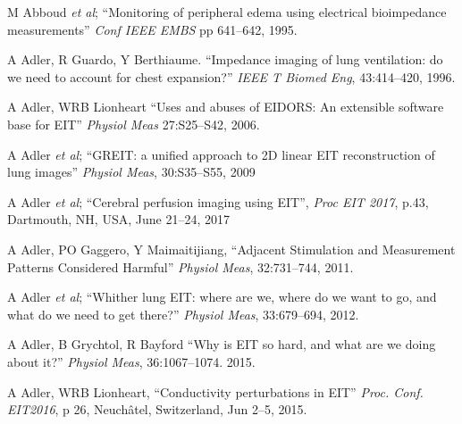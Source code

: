 \documentclass[10pt,journal]{IEEEtran}\def\TBLWIDA{15mm}\def\TBLWIDB{60mm}
\newcommand{\ifmaxthree}[2]{#2 {\em et al}; }
\begin{document}
\begin{thebibliography}{00}
      \setlength{\parskip}{0ex}%
      \setlength{\itemsep}{0ex}%
\ifmaxthree{
M Abboud, R Guardo, R Martineau, J Taillefer, C  Pelletier, 
}{
M Abboud
}
``Monitoring of peripheral edema using electrical bioimpedance measurements''
{\em Conf IEEE EMBS} pp 641--642, 1995.

A Adler, R Guardo, Y Berthiaume. 
``Impedance imaging of lung ventilation: do we need to account for chest expansion?''
{\em  IEEE T Biomed Eng}, 43:414--420, 1996.


A Adler, WRB Lionheart
``Uses and abuses of EIDORS: An extensible software base for EIT''
{\em Physiol Meas} 27:S25--S42, 2006.

\ifmaxthree{
A Adler, JH Arnold, R Bayford, A Borsic, B Brown, P Dixon, TJC Faes, I Frerichs, H Gagnon, Y Gärber, B Grychtol, G Hahn, WRB Lionheart, A Malik, RP Patterson, J Stocks, A Tizzard, N Weiler, GK Wolf
}{
A Adler
}
``GREIT: a unified approach to 2D linear EIT reconstruction of lung images''
{\em Physiol Meas}, 30:S35--S55, 2009


\ifmaxthree{
A Adler, M Faulkner, K Aristovich, S Hannan, J Avery, DS Holder
}{
A Adler
}
``Cerebral perfusion imaging using EIT'',
{\em Proc EIT 2017}, p.43, Dartmouth, NH, USA, June 21--24, 2017


A Adler, PO Gaggero, Y Maimaitijiang,
``Adjacent Stimulation and Measurement Patterns Considered Harmful''
{\em Physiol Meas}, 32:731--744, 2011.


\ifmaxthree{
A Adler, MB Amato, JH Arnold, R Bayford, M Bodenstein, SH Böhm, BH Brown, I Frerichs, O Stenqvist, N Weiler, GK Wolf,
}{
A Adler
}
``Whither lung EIT: where are we, where do we want to go, and what do we need to get there?''
{\em Physiol Meas}, 33:679--694, 2012. 

A Adler, B Grychtol, R Bayford
``Why is EIT so hard, and what are we doing about it?''
{\em Physiol Meas}, 36:1067--1074. 2015.

A Adler, WRB Lionheart,
``Conductivity perturbations in EIT''
{\em Proc. Conf. EIT2016}, p 26, Neuchâtel, Switzerland, Jun 2--5, 2015.


\end{thebibliography}
\end{document}
